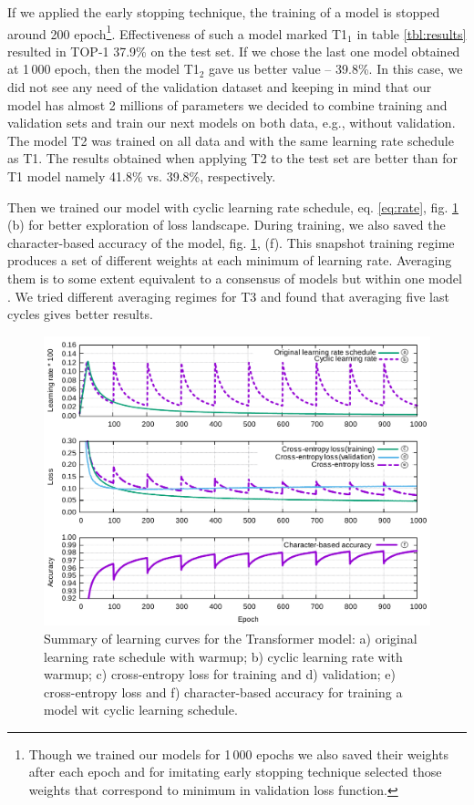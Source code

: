 \documentclass{article}
\begin{document}
If we applied the early stopping technique, the training of a model is stopped around 200 epoch\footnote{Though we trained our models for 1\,000 epochs we also saved their weights after each epoch and for imitating early stopping technique selected those weights that correspond to minimum in validation loss function.}. Effectiveness of such a model marked T1$_1$ in table \ref{tbl:results} resulted in TOP-1 37.9\% on the test set. If we chose the last one model obtained at 1\,000 epoch, then the model T1$_2$ gave us better value -- 39.8\%. In this case, we did not see any need of the validation dataset and keeping in mind that our model has almost 2 millions of parameters we decided to combine training and validation sets and train our next models on both data, e.g., without validation. The model T2 was trained on all data and with the same learning rate schedule as T1. The results obtained when applying T2 to the test set are better than for T1 model namely 41.8\% vs. 39.8\%, respectively.

Then we trained our model with cyclic learning rate schedule, eq. \ref{eq:rate}, fig. \ref{fig:example} (b) for better exploration of loss landscape. During training, we also saved the character-based accuracy of the model, fig. \ref{fig:example}, (f). This snapshot training regime \cite{Snapshot} produces a set of different weights at each minimum of learning rate. Averaging them is to some extent equivalent to a consensus of models but within one model \cite{Izmailov}. We tried different averaging regimes for T3 and found that averaging five last cycles gives better  results. 
\begin{figure}[t!]
  \centering
  \includegraphics[width = 16cm]{images/learning.pdf}
  \caption{Summary of learning curves for the Transformer model: a) original learning rate schedule with warmup; b) cyclic learning rate with warmup; c) cross-entropy loss  for training and d) validation;  e) cross-entropy loss and f) character-based accuracy for training a model wit cyclic learning schedule.}
  \label{fig:example}
\end{figure}
\end{document}
